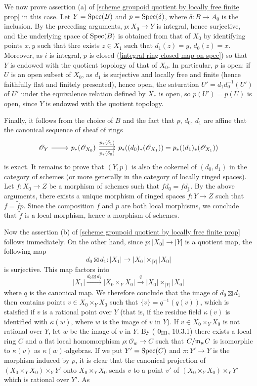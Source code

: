 We now prove assertion (a) of \cref{scheme groupoid quotient by locally free finite prop} in this case. Let $Y=\mathrm{Spec}(B)$ and $p=\mathrm{Spec}(\delta)$, where $\delta:B\to A_0$ is the inclusion. By the preceding arguments, $p:X_0\to Y$ is integral, hence surjective, and the underlying space of $\mathrm{Spec}(B)$ is obtained from that of $X_0$ by identifying points $x,y$ such that thre exists $z\in X_1$ such that $d_1(z)=y$, $d_0(z)=x$. Moreover, as $i$ is integral, $p$ is closed (\cref{integral ring closed map on spec}) so that $Y$ is endowed with the quotient topology of that of $X_0$. In particular, $p$ is open: if $U$ is an open subset of $X_0$, as $d_1$ is surjective and locally free and finite (hence faithfully flat and finitely presented), hence open, the saturation $U'=d_1d_0^{-1}(U')$ of $U'$ under the equivalence relation defined by $X_*$ is open, so $p(U')=p(U)$ is open, since $Y$ is endowed with the quotient topology.\par
Finally, it follows from the choice of $B$ and the fact that $p$, $d_0$, $d_1$ are affine that the canonical sequence of sheaf of rings
\[\begin{tikzcd}
\mathscr{O}_Y\ar[r]&p_*(\mathscr{O}_{X_0})\ar[r,shift left=2pt,"p_*(\delta_1)"]\ar[r,shift right=2pt,swap,"p_*(\delta_0)"]&p_*((d_0)_*(\mathscr{O}_{X_1}))=p_*((d_1)_*(\mathscr{O}_{X_1}))
\end{tikzcd}\]
is exact. It remains to prove that $(Y,p)$ is also the cokernel of $(d_0,d_1)$ in the category of schemes (or more generally in the category of locally ringed spaces). Let $f:X_0\to Z$ be a morphism of schemes such that $fd_0=fd_1$. By the above arguments, there exists a unique morphism of ringed spaces $\tilde{f}:Y\to Z$ such that $f=\tilde{f}p$. Since the composition $f$ and $p$ are both local morphisms, we conclude that $\tilde{f}$ is a local morphism, hence a morphism of schemes.\par
Now the assertion (b) of \cref{scheme groupoid quotient by locally free finite prop} follows immediately. On the other hand, since $p:|X_0|\to |Y|$ is a quotient map, the following map
\[d_0\boxtimes d_1:|X_1|\to |X_0|\times_{|Y|}|X_0|\]
is surjective. This map factors into
\[|X_1|\stackrel{d_0\boxtimes d_1}{\longrightarrow} |X_0\times_YX_0|\stackrel{q}{\longrightarrow}|X_0|\times_{|Y|}|X_0|\]
where $q$ is the canonical map. We therefore conclude that the image of $d_0\boxtimes d_1$ then contains points $v\in X_0\times_YX_0$ such that $\{v\}=q^{-1}(q(v))$, which is staisfied if $v$ is a rational point over $Y$ (that is, if the residue field $\kappa(v)$ is identified with $\kappa(w)$, where $w$ is the image of $v$ in $Y$). If $v\in X_0\times_YX_0$ is not rational over $Y$, let $w$ be the image of $v$ in $Y$. By (\cite{EGA3} $0_{\Rmnum{3}}$, 10.3.1) there exists a local ring $C$ and a flat local homomorphism $\rho:\mathscr{O}_w\to C$ such that $C/\mathfrak{m}_wC$ is isomorphic to $\kappa(v)$ as $\kappa(w)$-algebras. If we put $Y'=\mathrm{Spec}(C)$ and $\pi:Y'\to Y$ is the morphism induced by $\rho$, it is clear that the canonical projection of $(X_0\times_YX_0)\times_YY'$ onto $X_0\times_YX_0$ sends $v$ to a point $v'$ of $(X_0\times_YX_0)\times_YY'$ which is rational over $Y'$. As
